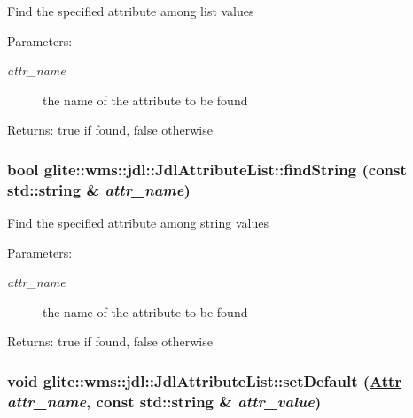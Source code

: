 Find the specified attribute among list values \begin{Desc}
\item[Parameters:]
\begin{description}
\item[{\em attr\_\-name}]the name of the attribute to be found \end{description}
\end{Desc}
\begin{Desc}
\item[Returns:]true if found, false otherwise \end{Desc}
\hypertarget{classglite_1_1wms_1_1jdl_1_1JdlAttributeList_a4}{
\subsubsection[findString]{\setlength{\rightskip}{0pt plus 5cm}bool glite::wms::jdl::Jdl\-Attribute\-List::find\-String (const std::string \& {\em attr\_\-name})}}
\label{classglite_1_1wms_1_1jdl_1_1JdlAttributeList_a4}


Find the specified attribute among string values \begin{Desc}
\item[Parameters:]
\begin{description}
\item[{\em attr\_\-name}]the name of the attribute to be found \end{description}
\end{Desc}
\begin{Desc}
\item[Returns:]true if found, false otherwise \end{Desc}
\hypertarget{classglite_1_1wms_1_1jdl_1_1JdlAttributeList_z25_7}{
\subsubsection[setDefault]{\setlength{\rightskip}{0pt plus 5cm}void glite::wms::jdl::Jdl\-Attribute\-List::set\-Default (\hyperlink{classglite_1_1wms_1_1jdl_1_1JdlAttributeList_z25_0}{Attr} {\em attr\_\-name}, const std::string \& {\em attr\_\-value})}}
\label{classglite_1_1wms_1_1jdl_1_1JdlAttributeList_z25_7}


